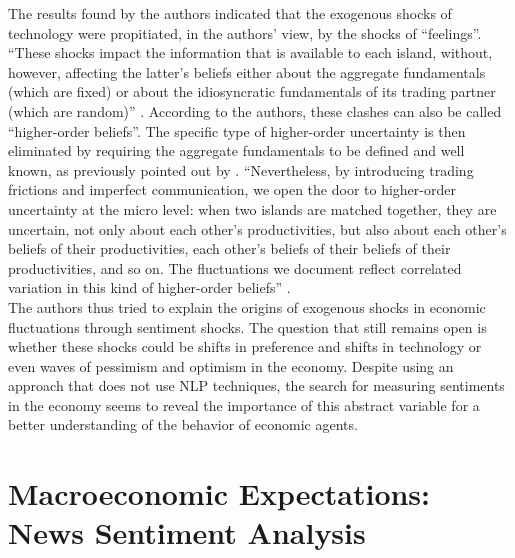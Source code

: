 The results found by the authors indicated that the exogenous shocks of technology were propitiated, in the authors' view, by the shocks of ``feelings''. ``These shocks impact the information that is available to each island, without, however, affecting the latter's beliefs either about the aggregate fundamentals (which are fixed) or about the idiosyncratic fundamentals of its trading partner (which are random)'' \cite[p.742]{angeletos2013sentiments}. According to the authors, these clashes can also be called ``higher-order beliefs''. The specific type of higher-order uncertainty is then eliminated by requiring the aggregate fundamentals to be defined and well known, as previously pointed out by \cite{morris2002social, woodford2001imperfect}. ``Nevertheless, by introducing trading frictions and imperfect communication, we open the door to higher-order uncertainty at the micro level: when two islands are matched together, they are uncertain, not only about each other's productivities, but also about each other's beliefs of their productivities, each other's beliefs of their beliefs of their productivities, and so on. The fluctuations
we document reflect correlated variation in this kind of higher-order beliefs'' \cite[p.742]{angeletos2013sentiments}.\\

The authors thus tried to explain the origins of exogenous shocks in economic fluctuations through sentiment shocks. The question that still remains open is whether these shocks could be shifts in preference and shifts in technology or even waves of pessimism and optimism in the economy. Despite using an approach that does not use NLP techniques, the search for measuring sentiments in the economy seems to reveal the importance of this abstract variable for a better understanding of the behavior of economic agents.\\

\section{Macroeconomic Expectations: News Sentiment Analysis}


